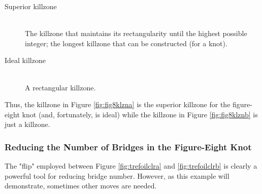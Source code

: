 \documentclass[titlepage]{article}
\begin{document}
\begin{defi}
    \begin{description}
        \item[Superior killzone] \hfill \\ The killzone that maintains its rectangularity until the highest possible integer; the longest killzone that can be constructed (for a knot).
        \item[Ideal killzone] \hfill \\ A rectangular killzone.
    \end{description}
\end{defi}

Thus, the killzone in Figure \ref{fig:fig8klzna} is the superior killzone for the figure-eight knot (and, fortunately, is ideal) while the killzone in Figure \ref{fig:fig8klznb} is just a killzone.


\subsubsection{Reducing the Number of Bridges in the Figure-Eight Knot}\label{ss2:fig8reduce}
The "flip" employed between Figure \ref{fig:trefoilclra} and \ref{fig:trefoilclrb} is clearly a powerful tool for reducing bridge number. However, as this example will demonstrate, sometimes other moves are needed.\par
\end{document}
